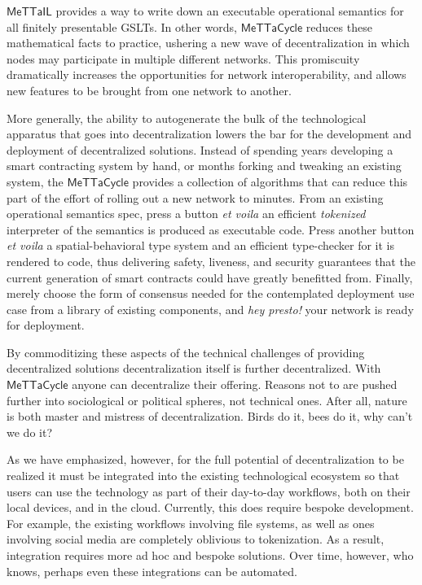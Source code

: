 \documentclass{article}
\newcommand{\MC}{\mathsf{MeTTaCycle}}
\begin{document}
$\mathsf{MeTTaIL}$ provides a way to write down an executable
operational semantics for all finitely presentable GSLTs. In other
words, $\MC$ reduces these mathematical facts to practice, ushering a
new wave of decentralization in which nodes may participate in
multiple different networks. This promiscuity dramatically increases
the opportunities for network interoperability, and allows new
features to be brought from one network to another.

More generally, the ability to autogenerate the bulk of the
technological apparatus that goes into decentralization lowers the bar
for the development and deployment of decentralized solutions. Instead
of spending years developing a smart contracting system by hand, or
months forking and tweaking an existing system, the $\MC$ provides a
collection of algorithms that can reduce this part of the effort of
rolling out a new network to minutes. From an existing operational
semantics spec, press a button \emph{et voila} an efficient
\emph{tokenized} interpreter of the semantics is produced as
executable code. Press another button \emph{et voila} a
spatial-behavioral type system and an efficient type-checker for it is
rendered to code, thus delivering safety, liveness, and security
guarantees that the current generation of smart contracts could have
greatly benefitted from. Finally, merely choose the form of consensus
needed for the contemplated deployment use case from a library of
existing components, and \emph{hey presto!} your network is ready for
deployment.

By commoditizing these aspects of the technical challenges of
providing decentralized solutions decentralization itself is further
decentralized. With $\MC$ anyone can decentralize their
offering. Reasons not to are pushed further into sociological or
political spheres, not technical ones. After all, nature is both
master and mistress of decentralization. Birds do it, bees do it, why
can't we do it?

As we have emphasized, however, for the full potential of
decentralization to be realized it must be integrated into the
existing technological ecosystem so that users can use the technology
as part of their day-to-day workflows, both on their local devices, and in
the cloud. Currently, this does require bespoke development. For
example, the existing workflows involving file systems, as well as
ones involving social media are completely oblivious to
tokenization. As a result, integration requires more ad hoc and
bespoke solutions. Over time, however, who knows, perhaps even these
integrations can be automated.
\end{document}
